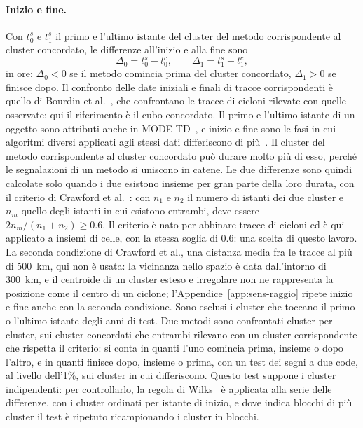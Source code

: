 \paragraph{Inizio e fine.} Con $t_0^s$ e $t_1^s$ il primo e l'ultimo istante del cluster del metodo corrispondente al cluster concordato, le differenze all'inizio e alla fine sono
\begin{equation}
\Delta_0=t_0^s-t_0^c,\qquad \Delta_1=t_1^s-t_1^c ,
\end{equation}
in ore: $\Delta_0<0$ se il metodo comincia prima del cluster concordato, $\Delta_1>0$ se finisce dopo. Il confronto delle date iniziali e finali di tracce corrispondenti è quello di Bourdin et al.~\cite{bourdin2022tc}, che confrontano le tracce di cicloni rilevate con quelle osservate; qui il riferimento è il cubo concordato. Il primo e l'ultimo istante di un oggetto sono attributi anche in MODE-TD~\cite{clark2014mode}, e inizio e fine sono le fasi in cui algoritmi diversi applicati agli stessi dati differiscono di più~\cite{neu2013imilast}. Il cluster del metodo corrispondente al cluster concordato può durare molto più di esso, perché le segnalazioni di un metodo si uniscono in catene. Le due differenze sono quindi calcolate solo quando i due esistono insieme per gran parte della loro durata, con il criterio di Crawford et al.~\cite{crawford2021cyclones}: con $n_1$ e $n_2$ il numero di istanti dei due cluster e $n_m$ quello degli istanti in cui esistono entrambi, deve essere $2n_m/(n_1+n_2)\ge0.6$. Il criterio è nato per abbinare tracce di cicloni ed è qui applicato a insiemi di celle, con la stessa soglia di 0.6: una scelta di questo lavoro. La seconda condizione di Crawford et al., una distanza media fra le tracce al più di 500~km, qui non è usata: la vicinanza nello spazio è data dall'intorno di 300~km, e il centroide di un cluster esteso e irregolare non ne rappresenta la posizione come il centro di un ciclone; l'Appendice~\ref{app:sens-raggio} ripete inizio e fine anche con la seconda condizione. Sono esclusi i cluster che toccano il primo o l'ultimo istante degli anni di test. Due metodi sono confrontati cluster per cluster, sui cluster concordati che entrambi rilevano con un cluster corrispondente che rispetta il criterio: si conta in quanti l'uno comincia prima, insieme o dopo l'altro, e in quanti finisce dopo, insieme o prima, con un test dei segni a due code, al livello dell'1\%, sui cluster in cui differiscono. Questo test suppone i cluster indipendenti: per controllarlo, la regola di Wilks~\cite{wilks1997resampling} è applicata alla serie delle differenze, con i cluster ordinati per istante di inizio, e dove indica blocchi di più cluster il test è ripetuto ricampionando i cluster in blocchi.

